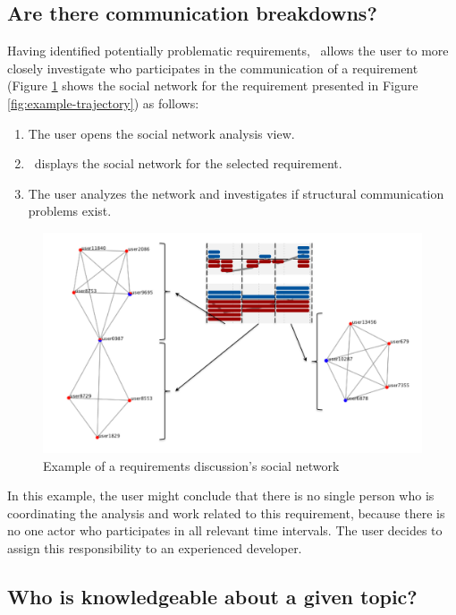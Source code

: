 \subsection{Are there communication breakdowns?}
Having identified potentially problematic requirements, \viss\  allows the user to more closely investigate who participates in the communication of a requirement (Figure \ref{fig:example-sn} shows the social network for the requirement presented in Figure \ref{fig:example-trajectory}) as follows:
\begin{enumerate}
\item The user opens the social network analysis view.
\item \viss\ displays the social network for the selected requirement.
\item The user analyzes the network and investigates if structural communication problems exist.
\end{enumerate}

\begin{figure}
\centering
\includegraphics[width=0.8\columnwidth]{img/example-sn}
\caption{Example of a requirements discussion's social network}
\label{fig:example-sn}
\end{figure}

In this example, the user might conclude that there is no single person who is coordinating the analysis and work related to this requirement, because there is no one actor who participates in all relevant time intervals.
The user decides to assign this responsibility to an experienced developer.

\subsection{Who is knowledgeable about a given topic?}


